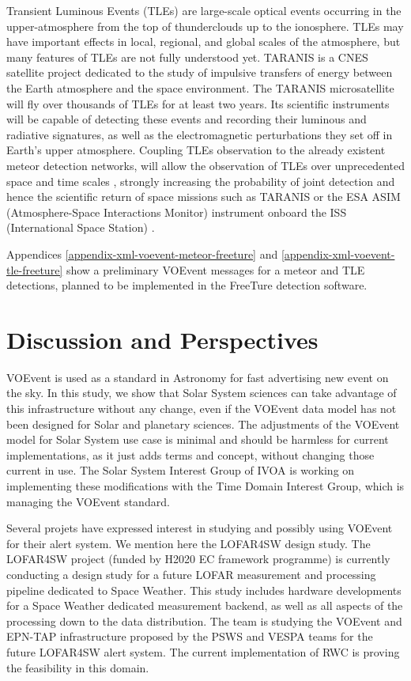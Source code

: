 \documentclass[referee,a4paper,12pt,traditabstract]{swsc}
\begin{document}
\begin{linenumbers}
Transient Luminous Events (TLEs) are large-scale optical events occurring in the upper-atmosphere from the top of thunderclouds up to the ionosphere. TLEs may have important effects in local, regional, and global scales of the atmosphere, but many features of TLEs are not fully understood yet. TARANIS is a CNES satellite project dedicated to the study of impulsive transfers of energy between the Earth atmosphere and the space environment. The TARANIS microsatellite will fly over thousands of TLEs for at least two years. Its scientific instruments will be capable of detecting these events and recording their luminous and radiative signatures, as well as the electromagnetic perturbations they set off in Earth's upper atmosphere. Coupling TLEs observation to the already existent meteor detection networks, will allow the observation of TLEs over unprecedented space and time scales \cite{2017AGUFMAE23A2469G}, strongly increasing the probability of joint detection and hence the scientific return of space missions such as TARANIS or the ESA ASIM (Atmosphere-Space Interactions Monitor) instrument onboard the ISS (International Space Station) \cite{2009AIPC.1118....8N}.

Appendices \ref{appendix-xml-voevent-meteor-freeture} and  \ref{appendix-xml-voevent-tle-freeture} show a preliminary VOEvent messages for a meteor and TLE detections, planned to be implemented in the FreeTure \cite{2014pim4.conf...39A} detection software. 

\section{Discussion and Perspectives}

VOEvent is used as a standard in Astronomy for fast advertising new event on the sky. In this study, we show that Solar System sciences can take advantage of this infrastructure without any change, even if the VOEvent data model has not been designed for Solar and planetary sciences. The adjustments of the VOEvent model for Solar System use case is minimal and should be harmless for current implementations, as it just adds terms and concept, without changing those current in use. The Solar System Interest Group of IVOA is working on implementing these modifications with the Time Domain Interest Group, which is managing the VOEvent standard. 

Several projets have expressed interest in studying and possibly using VOEvent for their alert system. We mention here the LOFAR4SW design study.
The LOFAR4SW project (funded by H2020 EC framework programme) is currently conducting a design study for a future LOFAR measurement and processing pipeline dedicated to Space Weather. This study includes hardware developments for a Space Weather dedicated measurement backend, as well as all aspects of the processing down to the data distribution. The team is studying the VOEvent and EPN-TAP infrastructure proposed by the PSWS and VESPA teams for the future LOFAR4SW alert system. The current implementation of RWC is proving the feasibility in this domain. 


\end{linenumbers}
\end{document}

